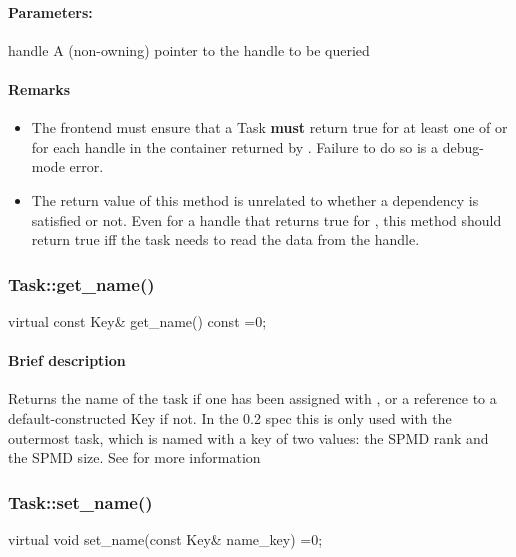 \paragraph{Parameters:} 
\begin{compactdesc}
\item[handle] A (non-owning) pointer to the handle to be queried
\end{compactdesc}

\paragraph{Remarks} 
\begin{itemize}
\item The frontend must ensure that a Task {\bf must} return true for at least one of
        or  for each handle in the container returned by
       .  Failure to do so is a debug-mode error.
\item The return value of this method is unrelated to whether a dependency is
       satisfied or not.  Even for a handle that returns true for ,
       this method should return true iff the task needs to read the data from the handle.
\end{itemize}     


\subsubsection{Task::get\_name()}
\begin{CppCode}
    virtual const Key&
    get_name() const =0;
\end{CppCode}

\paragraph{Brief description} Returns the name of the task if one has been assigned with , or
       a reference to a default-constructed Key if not.
       In the 0.2 spec this is only used with the outermost task, which is named with
       a key of two  values: the SPMD rank and the SPMD size.  See 
       for more information


\subsubsection{Task::set\_name()}
\begin{CppCode}
    virtual void
    set_name(const Key& name_key) =0;
\end{CppCode}

